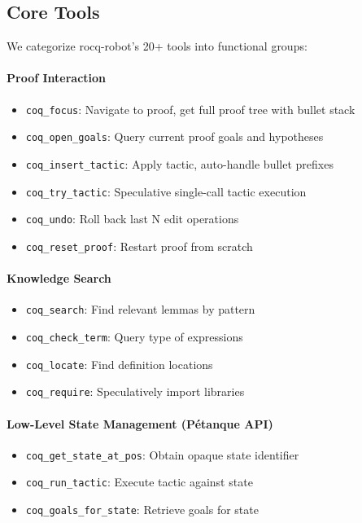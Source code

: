 \documentclass[sigconf,screen,nonacm]{acmart}
\begin{document}
\subsection{Core Tools}

We categorize rocq-robot's 20+ tools into functional groups:

\paragraph{Proof Interaction}
\begin{itemize}
\item \texttt{coq\_focus}: Navigate to proof, get full proof tree with bullet stack
\item \texttt{coq\_open\_goals}: Query current proof goals and hypotheses
\item \texttt{coq\_insert\_tactic}: Apply tactic, auto-handle bullet prefixes
\item \texttt{coq\_try\_tactic}: Speculative single-call tactic execution
\item \texttt{coq\_undo}: Roll back last N edit operations
\item \texttt{coq\_reset\_proof}: Restart proof from scratch
\end{itemize}

\paragraph{Knowledge Search}
\begin{itemize}
\item \texttt{coq\_search}: Find relevant lemmas by pattern
\item \texttt{coq\_check\_term}: Query type of expressions
\item \texttt{coq\_locate}: Find definition locations
\item \texttt{coq\_require}: Speculatively import libraries
\end{itemize}

\paragraph{Low-Level State Management (Pétanque API)}
\begin{itemize}
\item \texttt{coq\_get\_state\_at\_pos}: Obtain opaque state identifier
\item \texttt{coq\_run\_tactic}: Execute tactic against state
\item \texttt{coq\_goals\_for\_state}: Retrieve goals for state
\end{itemize}
\end{document}
